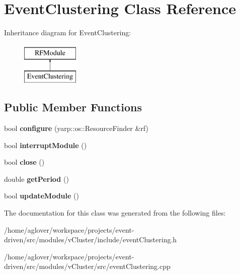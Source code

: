 \hypertarget{classEventClustering}{}\section{Event\+Clustering Class Reference}
\label{classEventClustering}
Inheritance diagram for Event\+Clustering\+:\begin{figure}[H]
\begin{center}
\leavevmode
\includegraphics[height=2.000000cm]{classEventClustering}
\end{center}
\end{figure}
\subsection*{Public Member Functions}
\begin{DoxyCompactItemize}
\item 
bool {\bfseries configure} (yarp\+::os\+::\+Resource\+Finder \&rf)\hypertarget{classEventClustering_a9111f5db3d21a2a80bef0ac5a6996d06}{}\label{classEventClustering_a9111f5db3d21a2a80bef0ac5a6996d06}

\item 
bool {\bfseries interrupt\+Module} ()\hypertarget{classEventClustering_adb2bb1f480ac61629327d5170dd64398}{}\label{classEventClustering_adb2bb1f480ac61629327d5170dd64398}

\item 
bool {\bfseries close} ()\hypertarget{classEventClustering_af27e70c40cdfddab01c1fffed35620a3}{}\label{classEventClustering_af27e70c40cdfddab01c1fffed35620a3}

\item 
double {\bfseries get\+Period} ()\hypertarget{classEventClustering_afe356ead5fe50d67b2007e3f99f7818f}{}\label{classEventClustering_afe356ead5fe50d67b2007e3f99f7818f}

\item 
bool {\bfseries update\+Module} ()\hypertarget{classEventClustering_a25159637f1dc8c9cd27cde191b7296d2}{}\label{classEventClustering_a25159637f1dc8c9cd27cde191b7296d2}

\end{DoxyCompactItemize}


The documentation for this class was generated from the following files\+:\begin{DoxyCompactItemize}
\item 
/home/aglover/workspace/projects/event-\/driven/src/modules/v\+Cluster/include/event\+Clustering.\+h\item 
/home/aglover/workspace/projects/event-\/driven/src/modules/v\+Cluster/src/event\+Clustering.\+cpp\end{DoxyCompactItemize}
